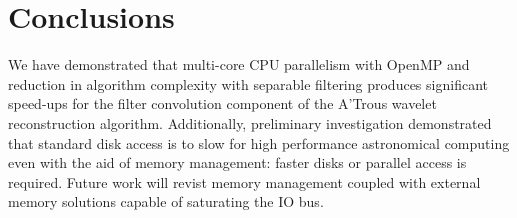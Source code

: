 \section{Conclusions}

We have demonstrated that multi-core CPU parallelism with OpenMP and reduction in algorithm complexity with separable filtering produces significant speed-ups
for the filter convolution component of the A'Trous wavelet reconstruction algorithm. Additionally, preliminary investigation demonstrated
that standard disk access is to slow for high performance astronomical computing even with the aid of memory management: faster disks or parallel access is required.  Future work will revist memory management coupled with external memory solutions capable of saturating the IO bus.


